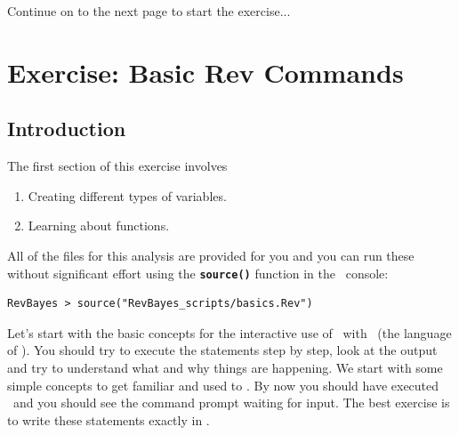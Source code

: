 \documentclass[11pt]{article}
\newcommand{\cl}[1]{{\texttt{\textbf{#1}}}}
\newcommand{\mbcl}[1]{\exs{\cl{MrBayes > {#1}}}}
\begin{document}
%



\vspace{5mm}

{\begin{framed}
\begin{center}
Continue on to the next page to start the exercise...
\end{center}
\end{framed}}






%
%
\newpage
\FloatBarrier
\section{Exercise: Basic Rev Commands}

\subsection{Introduction}

The first section of this exercise involves 
\begin{enumerate}
\item Creating different types of variables.
\item Learning about functions. 
\end{enumerate}

All of the files for this analysis are provided for you and you can run these without significant effort using the \cl{source()} function in the \RevBayes~console:
{\tt \begin{snugshade*}
\begin{lstlisting}
RevBayes > source("RevBayes_scripts/basics.Rev")
\end{lstlisting}
\end{snugshade*}}


Let's start with the basic concepts for the interactive use of \RevBayes~with \Rev~(the language of \RevBayes). 
You should try to execute the statements step by step, look at the output and try to understand what and why things are happening. 
We start with some simple concepts to get familiar and used to \RevBayes. 
By now you should have executed \RevBayes~and you should see the command prompt waiting for input. 
The best exercise is to write these statements exactly in \RevBayes. 
\end{document}
